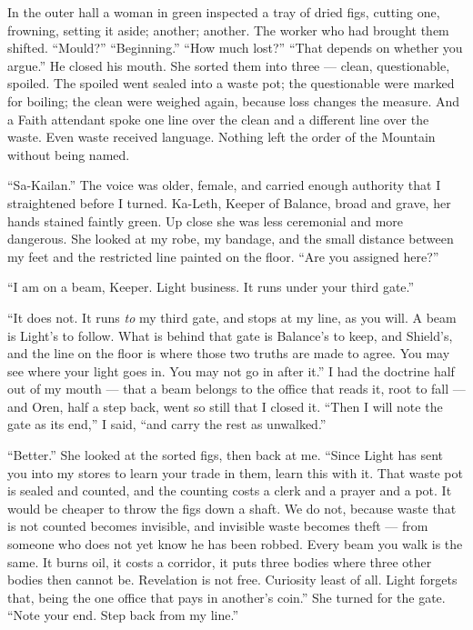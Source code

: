 In the outer hall a woman in green inspected a tray of dried figs, cutting one, frowning, setting it aside; another; another. The worker who had brought them shifted. ``Mould?'' ``Beginning.'' ``How much lost?'' ``That depends on whether you argue.'' He closed his mouth. She sorted them into three --- clean, questionable, spoiled. The spoiled went sealed into a waste pot; the questionable were marked for boiling; the clean were weighed again, because loss changes the measure. And a Faith attendant spoke one line over the clean and a different line over the waste. Even waste received language. Nothing left the order of the Mountain without being named.\par

``Sa-Kailan.'' The voice was older, female, and carried enough authority that I straightened before I turned. Ka-Leth, Keeper of Balance, broad and grave, her hands stained faintly green. Up close she was less ceremonial and more dangerous. She looked at my robe, my bandage, and the small distance between my feet and the restricted line painted on the floor. ``Are you assigned here?''\par

``I am on a beam, Keeper. Light business. It runs under your third gate.''\par

``It does not. It runs \textit{to} my third gate, and stops at my line, as you will. A beam is Light's to follow. What is behind that gate is Balance's to keep, and Shield's, and the line on the floor is where those two truths are made to agree. You may see where your light goes in. You may not go in after it.'' I had the doctrine half out of my mouth --- that a beam belongs to the office that reads it, root to fall --- and Oren, half a step back, went so still that I closed it. ``Then I will note the gate as its end,'' I said, ``and carry the rest as unwalked.''\par

``Better.'' She looked at the sorted figs, then back at me. ``Since Light has sent you into my stores to learn your trade in them, learn this with it. That waste pot is sealed and counted, and the counting costs a clerk and a prayer and a pot. It would be cheaper to throw the figs down a shaft. We do not, because waste that is not counted becomes invisible, and invisible waste becomes theft --- from someone who does not yet know he has been robbed. Every beam you walk is the same. It burns oil, it costs a corridor, it puts three bodies where three other bodies then cannot be. Revelation is not free. Curiosity least of all. Light forgets that, being the one office that pays in another's coin.'' She turned for the gate. ``Note your end. Step back from my line.''\par

